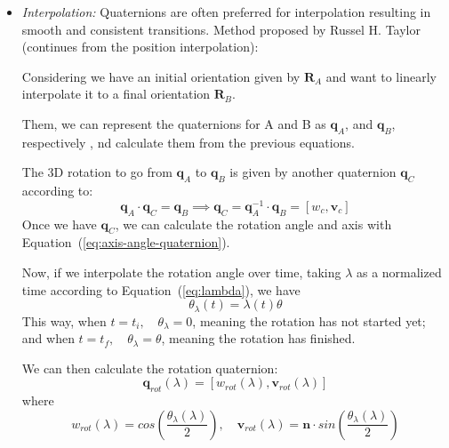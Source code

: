 \documentclass[10pt, aspectratio=169]{beamer}
\theoremstyle{remark}
\theoremstyle{definition}
\begin{document}
\begin{frame}[allowframebreaks]
\begin{enumerate}
\begin{itemize}
        \framebreak

        
        \item \textit{Interpolation:} Quaternions are often preferred for interpolation resulting in smooth and consistent transitions. Method proposed by Russel H. Taylor~\cite{taylor1979planning} (continues from the position interpolation):

        Considering we have an initial orientation given by $\mathbf{R}_A$ and want to linearly interpolate it to a final orientation $\mathbf{R}_B$.

        Them, we can represent the quaternions for A and B as $\mathbf{q}_A$, and $\mathbf{q}_B$, respectively , nd calculate them from the previous equations.

        The 3D rotation to go from $\mathbf{q}_A$ to $\mathbf{q}_B$ is given by another quaternion $\mathbf{q}_C$ according to:
        \begin{equation}
        \mathbf{q}_A \cdot \mathbf{q}_C = \mathbf{q}_B \implies \mathbf{q}_C = \mathbf{q}_A^{-1} \cdot \mathbf{q}_B = [w_c, \textbf{v}_c]
        \end{equation}
        Once we have $\mathbf{q}_C$, we can calculate the rotation angle and axis with Equation~(\ref{eq:axis-angle-quaternion}).

        \framebreak

        Now, if we interpolate the rotation angle over time, taking $\lambda$ as a normalized time according to Equation~(\ref{eq:lambda}), we have
        \begin{equation}
            \theta_\lambda(t) = \lambda(t) \theta
        \end{equation}      
        This way, when $t = t_i, \quad \theta_\lambda = 0$, meaning the rotation has not started yet; and when $t = t_f, \quad \theta_\lambda = \theta$, meaning the rotation has finished.

        We can then calculate the rotation quaternion:
        \begin{equation}
            \mathbf{q}_{rot}(\lambda) = \left[w_{rot}(\lambda), \mathbf{v}_{rot}(\lambda)\right]
        \end{equation}
        where 
        $$
        w_{rot}(\lambda) = cos\left(\frac{\theta_\lambda(\lambda) }{2}\right), \quad \mathbf{v}_{rot}(\lambda) = \mathbf{n}\cdot sin \left(\frac{\theta_\lambda(\lambda)}{2} \right)
        $$


\end{itemize}
\end{enumerate}
\end{frame}
\end{document}
